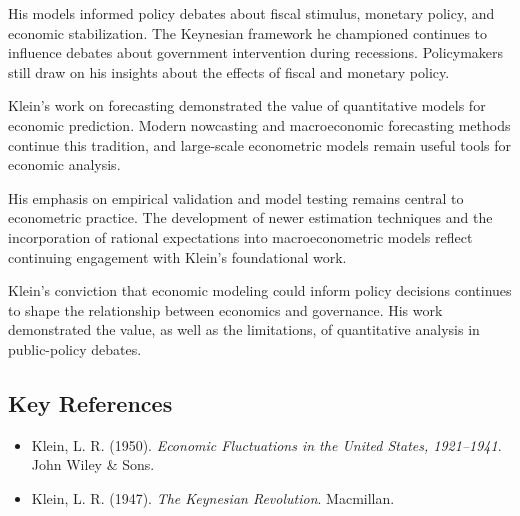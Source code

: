 His models informed policy debates about fiscal stimulus, monetary policy,
and economic stabilization. The Keynesian framework he championed continues to
influence debates about government intervention during recessions. Policymakers
still draw on his insights about the effects of fiscal and monetary policy.

Klein's work on forecasting demonstrated the value of quantitative models for
economic prediction. Modern nowcasting and macroeconomic forecasting methods
continue this tradition, and large-scale econometric models remain useful tools
for economic analysis.

His emphasis on empirical validation and model testing remains central to
econometric practice. The development of newer estimation techniques and the
incorporation of rational expectations into macroeconometric models reflect
continuing engagement with Klein's foundational work.

Klein's conviction that economic modeling could inform policy decisions
continues to shape the relationship between economics and governance. His work
demonstrated the value, as well as the limitations, of quantitative analysis in
public-policy debates.

\subsection*{Key References}
\begin{itemize}
    \item Klein, L. R. (1950). \textit{Economic Fluctuations in the United States, 1921--1941}. John Wiley \& Sons.
    \item Klein, L. R. (1947). \textit{The Keynesian Revolution}. Macmillan.
\end{itemize}
